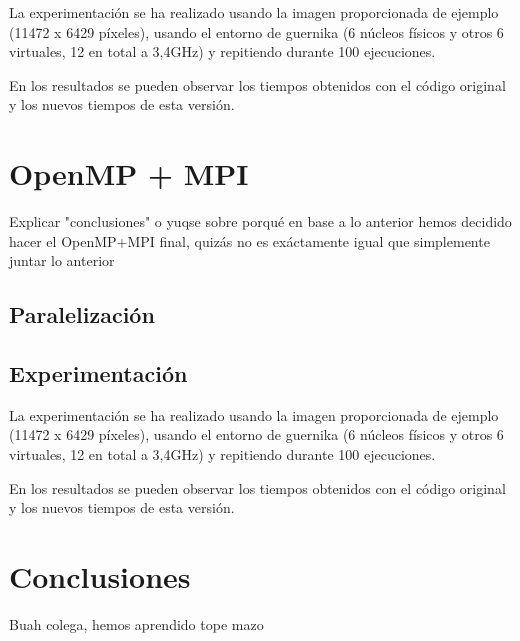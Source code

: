 \documentclass[12pt]{report} %
\begin{document}
La experimentación se ha realizado usando la imagen proporcionada de ejemplo (11472 x 6429 píxeles), usando el entorno de guernika (6 núcleos físicos y otros 6 virtuales, 12 en total a 3,4GHz) y repitiendo durante 100 ejecuciones.

En los resultados se pueden observar los tiempos obtenidos con el código original y los nuevos tiempos de esta versión.

\chapter{OpenMP + MPI}
\label{chap:OpenMP+MPI}
Explicar "conclusiones" o yuqse sobre porqué en base a lo anterior hemos decidido hacer el OpenMP+MPI final, quizás no es exáctamente igual que simplemente juntar lo anterior

\section{Paralelización}

\section{Experimentación}

La experimentación se ha realizado usando la imagen proporcionada de ejemplo (11472 x 6429 píxeles), usando el entorno de guernika (6 núcleos físicos y otros 6 virtuales, 12 en total a 3,4GHz) y repitiendo durante 100 ejecuciones.

En los resultados se pueden observar los tiempos obtenidos con el código original y los nuevos tiempos de esta versión.

\chapter{Conclusiones}

Buah colega, hemos aprendido tope mazo
\end{document}

